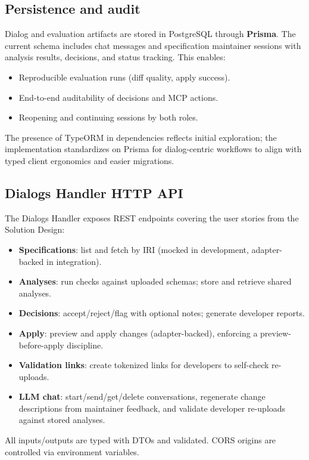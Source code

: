 \subsection{Persistence and audit}
Dialog and evaluation artifacts are stored in PostgreSQL through \textbf{Prisma}. The current schema includes chat messages and specification maintainer sessions with analysis results, decisions, and status tracking. This enables:
\begin{itemize}
  \item Reproducible evaluation runs (diff quality, apply success).
  \item End-to-end auditability of decisions and MCP actions.
  \item Reopening and continuing sessions by both roles.
\end{itemize}
The presence of TypeORM in dependencies reflects initial exploration; the implementation standardizes on Prisma for dialog-centric workflows to align with typed client ergonomics and easier migrations.

\subsection{Dialogs Handler HTTP API}
The Dialogs Handler exposes REST endpoints covering the user stories from the Solution Design:
\begin{itemize}
  \item \textbf{Specifications}: list and fetch by IRI (mocked in development, adapter-backed in integration).
  \item \textbf{Analyses}: run checks against uploaded schemas; store and retrieve shared analyses.
  \item \textbf{Decisions}: accept/reject/flag with optional notes; generate developer reports.
  \item \textbf{Apply}: preview and apply changes (adapter-backed), enforcing a preview-before-apply discipline.
  \item \textbf{Validation links}: create tokenized links for developers to self-check re-uploads.
  \item \textbf{LLM chat}: start/send/get/delete conversations, regenerate change descriptions from maintainer feedback, and validate developer re-uploads against stored analyses.
\end{itemize}
All inputs/outputs are typed with DTOs and validated. CORS origins are controlled via environment variables.


